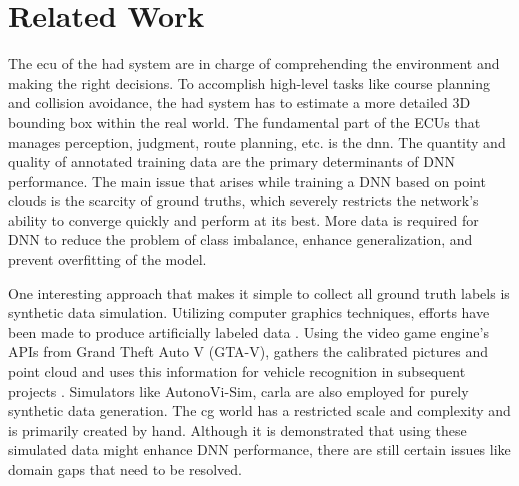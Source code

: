 \chapter{Related Work}
The \acrfull{ecu} of the \acrshort{had} system are in charge of comprehending the environment and making the right decisions. To accomplish high-level tasks like course planning and collision avoidance, the \acrshort{had} system has to estimate a more detailed 3D bounding box within the real world. The fundamental part of the ECUs that manages perception, judgment, route planning, etc. is the  \acrfull{dnn}. The quantity and quality of annotated training data are the primary determinants of DNN performance. The main issue that arises while training a DNN based on point clouds is the scarcity of ground truths, which severely restricts the network's ability to converge quickly and perform at its best. More data is required for DNN to reduce the problem of class imbalance, enhance generalization, and prevent overfitting of the model.

One interesting approach that makes it simple to collect all ground truth labels is synthetic data simulation. Utilizing computer graphics techniques, efforts have been made to produce artificially labeled data \parencite{SuQLG15, 8462926, abs-1809-08495}.  Using the video game engine's APIs from Grand Theft Auto V (GTA-V), \parencite{abs-1804-00103} gathers the calibrated pictures and point cloud and uses this information for vehicle recognition in subsequent projects \parencite{8462926}. Simulators like AutonoVi-Sim, \acrshort{carla}  \parencite{8575306, Dosovitskiy17} are also employed for purely synthetic data generation. The \acrlong{cg} world has a restricted scale and complexity and is primarily created by hand. Although it is demonstrated that using these simulated data might enhance DNN performance, there are still certain issues like domain gaps\parencite{zero_domain_gap, care_real_and_syn_gap} that need to be resolved. 


